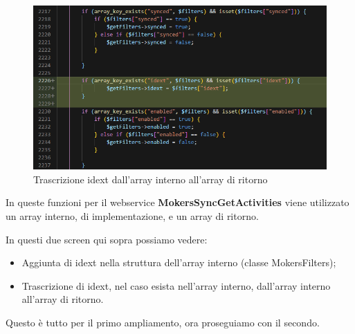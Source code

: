 \begin{figure}[!h] 
	\centering
	\includegraphics[scale = 0.5]{immagini/webservices/ampliamenti/1ampl_mokers_getidext.png}
	\caption{Trascrizione idext dall'array interno all'array di ritorno}
\end{figure}
\newspace
\newspace
\begin{flushleft}
	In queste funzioni per il webservice \textbf{MokersSyncGetActivities} viene utilizzato un array interno, di implementazione, e un array di ritorno.
	
	In questi due screen  qui sopra possiamo vedere:
	\begin{itemize}
		\item Aggiunta di idext nella struttura dell'array interno (classe MokersFilters);
		\item Trascrizione di idext, nel caso esista nell'array interno, dall'array interno all'array di ritorno.
	\end{itemize}
	
	Questo è tutto per il primo ampliamento, ora proseguiamo con il secondo.
\end{flushleft}
\newpage

